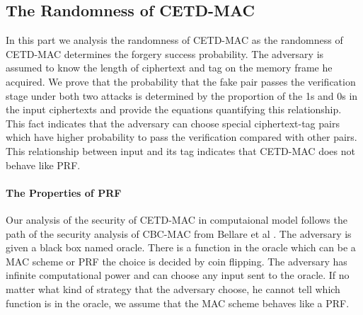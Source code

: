 
\subsection{The Randomness of CETD-MAC}\label{sect:cetd-prf}
In this part we analysis the randomness of CETD-MAC as the randomness of CETD-MAC determines the forgery success probability. 
The adversary is assumed to know the length of ciphertext and tag on the memory frame he acquired. 
We prove that the probability that the fake pair passes the verification stage under both two attacks is determined by the proportion of the 1s and 0s in the input ciphertexts and provide the equations quantifying this relationship. This fact indicates that the adversary can choose special ciphertext-tag pairs which have higher probability to pass the verification compared with other pairs. This relationship between input and its tag indicates that CETD-MAC does not behave like PRF.  
 
\paragraph{The Properties of PRF}
Our analysis of the security of CETD-MAC in computaional model follows the path of the security analysis of CBC-MAC from Bellare et
al \cite{cbc2000}. The adversary is given a black box named oracle. There is a function
in the oracle which can be a MAC scheme or PRF the choice is decided by coin flipping. The adversary has infinite
computational power and can choose any input sent to the oracle. If no matter
what kind of strategy that the adversary choose, he cannot tell which function
is in the oracle, we assume that the MAC scheme behaves like a PRF.  

